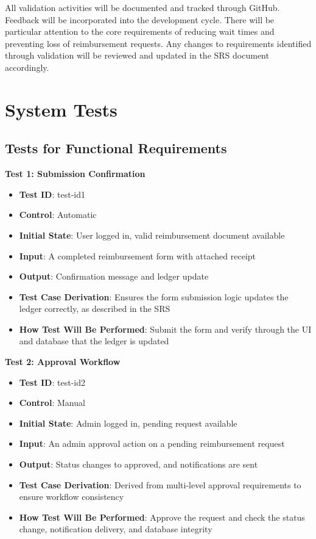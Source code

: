 \documentclass[12pt, titlepage]{article}
\begin{document}
All validation activities will be documented and tracked through GitHub. Feedback will be incorporated into the development cycle. There will be particular attention to the core requirements of reducing wait times and preventing loss of reimbursement requests. Any changes to requirements identified through validation will be reviewed and updated in the SRS document accordingly.

\section{System Tests}

\subsection{Tests for Functional Requirements}

\textbf{Test 1: Submission Confirmation}
\begin{itemize}
    \item \textbf{Test ID}: test-id1
    \item \textbf{Control}: Automatic
    \item \textbf{Initial State}: User logged in, valid reimbursement document available
    \item \textbf{Input}: A completed reimbursement form with attached receipt
    \item \textbf{Output}: Confirmation message and ledger update
    \item \textbf{Test Case Derivation}: Ensures the form submission logic updates the ledger correctly, as described in the SRS
    \item \textbf{How Test Will Be Performed}: Submit the form and verify through the UI and database that the ledger is updated
\end{itemize}

\textbf{Test 2: Approval Workflow}
\begin{itemize}
    \item \textbf{Test ID}: test-id2
    \item \textbf{Control}: Manual
    \item \textbf{Initial State}: Admin logged in, pending request available
    \item \textbf{Input}: An admin approval action on a pending reimbursement request
    \item \textbf{Output}: Status changes to approved, and notifications are sent
    \item \textbf{Test Case Derivation}: Derived from multi-level approval requirements to ensure workflow consistency
    \item \textbf{How Test Will Be Performed}: Approve the request and check the status change, notification delivery, and database integrity
\end{itemize}
\end{document}
